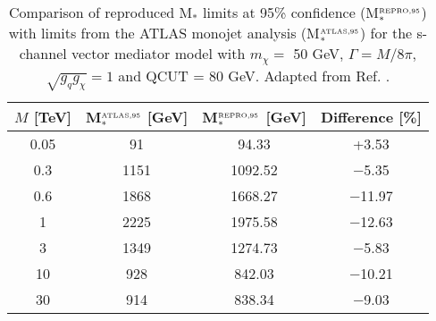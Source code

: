 \begin{flushleft}

\begin{table}[!htbp]
\centering
\begin{tabular}{c|c|c|c}
 \hline
 \hline
 $M$ [TeV] & M$_{*}^{\mbox{\tiny ATLAS,95}}$ [GeV] & M$_{*}^{\mbox{\tiny REPRO,95}}$ [GeV] & Difference [\%] \\ 
 \hline
0.05 & 91 & 94.33 & +3.53 \\
0.3 & 1151 & 1092.52 & $-$5.35 \\
0.6 & 1868 & 1668.27 & $-$11.97 \\
1 & 2225 & 1975.58 & $-$12.63 \\
3 & 1349 & 1274.73 & $-$5.83 \\
10 & 928 & 842.03 & $-$10.21 \\
30 & 914 & 838.34 & $-$9.03\\
 \hline
 \hline
\end{tabular}
\caption{Comparison of reproduced M$_{*}$ limits at 95\% confidence (M$_{*}^{\mbox{\tiny REPRO,95}}$) with limits from the ATLAS monojet analysis (M$_{*}^{\mbox{\tiny ATLAS,95}}$) for the s-channel vector mediator model with $m_{\chi} = $ 50 GeV, $\Gamma = M/8\pi$, $\sqrt{g_{q}g_{\chi}} = 1$ and QCUT = 80 GeV. Adapted from Ref. \cite{Aad:2015zva}.}
\label{M_star_limits_monojet}
\end{table}
\bigskip


\end{flushleft}
